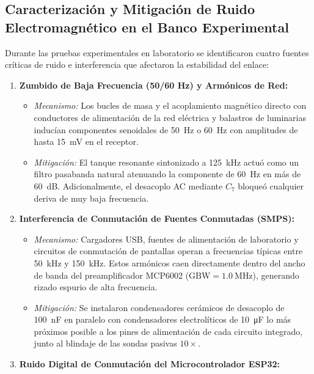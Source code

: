 \subsection{Caracterización y Mitigación de Ruido Electromagnético en el Banco Experimental}
\label{subsec:analisis_ruido}

Durante las pruebas experimentales en laboratorio se identificaron cuatro fuentes críticas de ruido e interferencia que afectaron la estabilidad del enlace:

\begin{enumerate}
    \item \textbf{Zumbido de Baja Frecuencia (50/60 Hz) y Armónicos de Red:}
    \begin{itemize}
        \item \textit{Mecanismo:} Los bucles de masa y el acoplamiento magnético directo con conductores de alimentación de la red eléctrica y balastros de luminarias inducían componentes senoidales de \SI{50}{\hertz} o \SI{60}{\hertz} con amplitudes de hasta \SI{15}{\milli\volt} en el receptor.
        \item \textit{Mitigación:} El tanque resonante sintonizado a \SI{125}{\kilo\hertz} actuó como un filtro pasabanda natural atenuando la componente de \SI{60}{\hertz} en más de \SI{60}{\deci\bel}. Adicionalmente, el desacoplo AC mediante $C_7$ bloqueó cualquier deriva de muy baja frecuencia.
    \end{itemize}
    \item \textbf{Interferencia de Conmutación de Fuentes Conmutadas (SMPS):}
    \begin{itemize}
        \item \textit{Mecanismo:} Cargadores USB, fuentes de alimentación de laboratorio y circuitos de conmutación de pantallas operan a frecuencias típicas entre \SI{50}{\kilo\hertz} y \SI{150}{\kilo\hertz}. Estos armónicos caen directamente dentro del ancho de banda del preamplificador MCP6002 ($\text{GBW} = \SI{1.0}{\mega\hertz}$), generando rizado espurio de alta frecuencia.
        \item \textit{Mitigación:} Se instalaron condensadores cerámicos de desacoplo de \SI{100}{\nano\farad} en paralelo con condensadores electrolíticos de \SI{10}{\micro\farad} lo más próximos posible a los pines de alimentación de cada circuito integrado, junto al blindaje de las sondas pasivas $10\times$.
    \end{itemize}
    \item \textbf{Ruido Digital de Conmutación del Microcontrolador ESP32:}

\end{enumerate}
